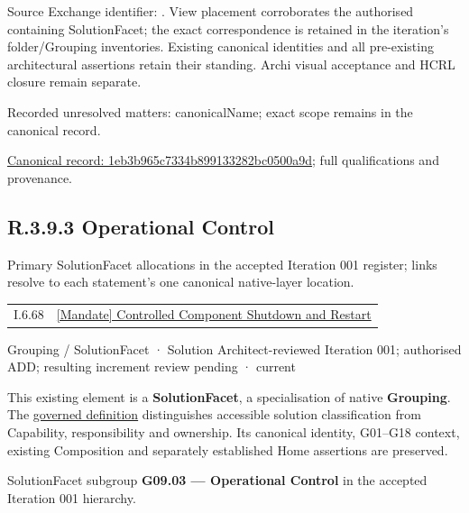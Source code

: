 Source Exchange identifier: \texttt{}. View placement corroborates
the authorised containing SolutionFacet; the exact correspondence is retained in the
iteration's folder/Grouping inventories. Existing canonical identities and all
pre-existing architectural assertions retain their standing. Archi visual
acceptance and HCRL closure remain separate.


{\small Recorded unresolved matters: canonicalName; exact scope remains in the canonical record.}\par
{\footnotesize \href{../../../../../../../continuum/grouping/1eb3b965c7334b899133282bc0500a9d.md}{Canonical record: 1eb3b965c7334b899133282bc0500a9d}; full qualifications and provenance.}\par
\subsection*{R.3.9.3 Operational Control}
\label{navigation:R.3.9.3}

Primary SolutionFacet allocations in the accepted Iteration 001 register; links resolve to each statement’s one canonical native-layer location.\par
\begin{longtable}{p{.22\linewidth}p{.73\linewidth}}
I.6.68 & \hyperref[element:96f7bfa320b049d2b76fcc35a1926883]{[Mandate] Controlled Component Shutdown and Restart} \\
\end{longtable}
\label{element:f0402eea7b5a49f9b61fbd90e336b2de}
{\small Grouping / SolutionFacet · Solution Architect-reviewed Iteration 001; authorised ADD; resulting increment review pending · current}\par

This existing element is a \textbf{SolutionFacet}, a specialisation of native
\textbf{Grouping}. The \href{\detokenize{../../../../../../../governance/continuum-representation.md#solutionfacet-classification--1119-candidate}}{governed definition}
distinguishes accessible solution classification from Capability, responsibility
and ownership. Its canonical identity, G01–G18 context, existing Composition
and separately established Home assertions are preserved.



SolutionFacet subgroup \textbf{G09.03 — Operational Control} in the accepted Iteration 001 hierarchy.



